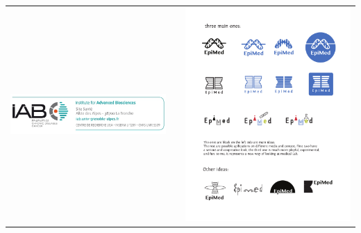 \documentclass[final]{beamer}
\newlength{\twocolwid}
\begin{document}
\begin{frame}[t]
\begin{columns}[t]
\begin{column}{\twocolwid}
\begin{center}
\begin{tabular}{ccc}
\includegraphics[trim = 0mm 0mm 160mm 10mm, clip, width=0.25\linewidth]{figs/logo_iab.jpg} & \hfill & 
\includegraphics[trim = 150mm 200mm 10mm 32mm, clip, width=0.2\linewidth]{figs/logo_epimed.pdf}
\end{tabular}
\end{center}


\end{column} %

\end{columns} %

\end{frame} %
\end{document}
